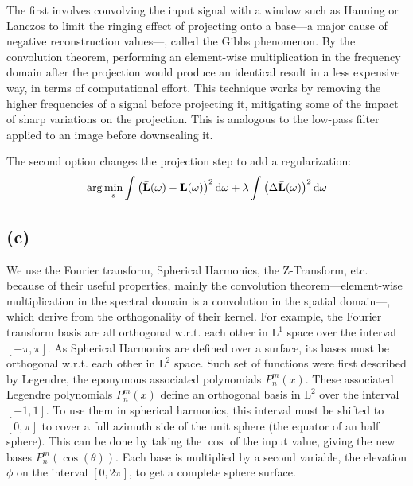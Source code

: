 \documentclass{report}
\begin{document}
The first involves convolving the input signal with a window such as Hanning or Lanczos to limit the ringing effect of projecting onto a base---a major cause of negative reconstruction values---, called the Gibbs phenomenon. By the convolution theorem, performing an element-wise multiplication in the frequency domain after the projection would produce an identical result in a less expensive way, in terms of computational effort. This technique works by removing the higher frequencies of a signal before projecting it, mitigating some of the impact of sharp variations on the projection. This is analogous to the low-pass filter applied to an image before downscaling it.

The second option changes the projection step to add a regularization:
\begin{equation}
\arg \min_s \int\left( \bar{\mathbf{L}}(\omega) - \mathbf{L}(\omega)\right)^2 \mathrm{d}\omega + \lambda \int \left(\Delta \bar{\mathbf{L}}(\omega)\right)^2 \mathrm{d}\omega
\end{equation}

\subsection{(c)}

We use the Fourier transform, Spherical Harmonics, the Z-Transform, etc. because of their useful properties, mainly the convolution theorem---element-wise multiplication in the spectral domain is a convolution in the spatial domain---, which derive from the orthogonality of their kernel. For example, the Fourier transform basis are all orthogonal w.r.t. each other in $\mathrm{L}^1$ space over the interval $\left[-\pi, \pi\right]$. As Spherical Harmonics are defined over a surface, its bases must be orthogonal w.r.t. each other in $\mathrm{L}^2$ space. Such set of functions were first described by Legendre, the eponymous associated polynomials $P_n^m(x)$. These associated Legendre polynomials $P_n^m(x)$ define an orthogonal basis in $\mathrm{L}^2$ over the interval $\left[ -1, 1 \right]$. To use them in spherical harmonics, this interval must be shifted to $\left[ 0, \pi \right]$ to cover a full azimuth side of the unit sphere (the equator of an half sphere). This can be done by taking the $\cos$ of the input value, giving the new bases $P_n^m\left(\cos(\theta)\right)$. Each base is multiplied by a second variable, the elevation $\phi$ on the interval $\left[ 0, 2\pi \right]$, to get a complete sphere surface.
\end{document}
